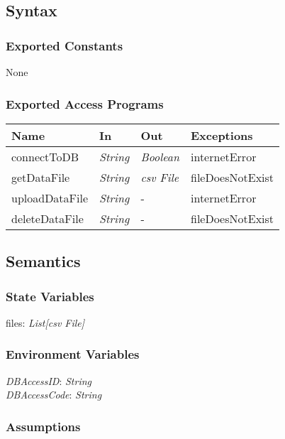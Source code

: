 \documentclass[12pt, titlepage]{article}
\begin{document}
\begin{itemize}
\subsection{Syntax}

\subsubsection{Exported Constants}
None

\subsubsection{Exported Access Programs}

\begin{center}
\begin{tabular}{p{4cm} p{3cm} p{3cm} p{3cm}}
\hline
\textbf{Name} & \textbf{In} & \textbf{Out} & \textbf{Exceptions} \\
\hline
connectToDB&  \textit{String} & \textit{Boolean} & internetError \\
getDataFile&  \textit{String} & \textit{csv File} & fileDoesNotExist \\
uploadDataFile&  \textit{String} & - & internetError \\
deleteDataFile&  \textit{String} & - & fileDoesNotExist \\
\hline
\end{tabular}
\end{center}

\subsection{Semantics}

\subsubsection{State Variables}

files: \textit{List[csv File]}

\subsubsection{Environment Variables}

\textit{DBAccessID}: \textit{String}\\
\textit{DBAccessCode}: \textit{String}

\subsubsection{Assumptions}


\end{itemize}
\end{document}
